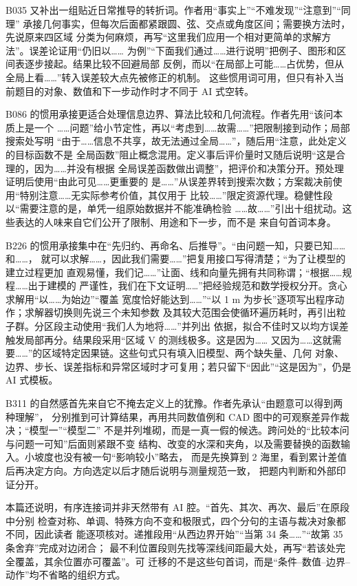 \documentclass[UTF8,a4paper,12pt]{ctexart}
\begin{document}
B035 又补出一组贴近日常推导的转折词。作者用“事实上”“不难发现”“注意到”“同理”
承接几何事实，但每次后面都紧跟圆、弦、交点或角度区间；需要换方法时，先说原来四区域
分类为何麻烦，再写“这里我们应用一个相对更简单的求解方法”。误差论证用“仍旧以……
为例”“下面我们通过……进行说明”把例子、图形和区间表逐步接起。结果比较不回避局部
反例，而以“在局部上可能……占优势，但从全局上看……”转入误差较大点先被修正的机制。
这些惯用词可用，但只有补入当前题目的对象、数值和下一步动作时才不同于 AI 式空转。

B086 的惯用承接更适合处理信息边界、算法比较和几何流程。作者先用“该问本质上是一个
……问题”给小节定性，再以“考虑到……故需……”把限制接到动作；局部搜索处写明
“由于……信息不共享，故无法通过全局……”，随后用“注意，此处定义的目标函数不是
全局函数”阻止概念混用。定义事后评价量时又随后说明“这是合理的，因为……并没有根据
全局误差函数做出调整”，把评价和决策分开。预处理证明后使用“由此可见……更重要的
是……”从误差界转到搜索次数；方案裁决前使用“特别注意……无实际参考价值，其仅用于
比较……”限定资源代理。稳健性段以“需要注意的是，单凭一组原始数据并不能准确检验
……故……”引出十组扰动。这些表达的人味来自它们公开了限制、用途和下一步，而不是
来自句首词本身。

B226 的惯用承接集中在“先归约、再命名、后推导”。“由问题一知，只要已知……和……，
就可以求解……，因此我们需要……”把复用接口写得清楚；“为了让模型的建立过程更加
直观易懂，我们记……”让面、线和向量先拥有共同称谓；“根据……规程……出于建模的
严谨性，我们在下文证明……”把经验规范和数学授权分开。贪心求解用“以……为始边”“覆盖
宽度恰好能达到……”“以 1 m 为步长”逐项写出程序动作；求解器切换则先说三个未知参数
及其较大范围会使循环遍历耗时，再引出粒子群。分区段主动使用“我们人为地将……”并列出
依据，拟合不佳时又以均方误差触发局部再分。结果段采用“区域 V 的测线极多。这是因为……
又因为……这就需要……”的区域特定因果链。这些句式只有填入旧模型、两个缺失量、几何
对象、边界、步长、误差指标和异常区域时才可复用；若只留下“因此”“这是因为”，仍是 AI
式模板。

B311 的自然感首先来自它不掩去定义上的犹豫。作者先承认“由题意可以得到两种理解”，
分别推到可计算结果，再用共同数值例和 CAD 图中的可观察差异作裁决；“模型一”“模型二”
不是并列堆砌，而是一真一假的候选。跨问处的“比较本问与问题一可知”后面则紧跟不变
结构、改变的水深和夹角，以及需要替换的函数输入。小坡度也没有被一句“影响较小”略去，
而是先换算到 2 海里，看到累计差值后再决定方向。方向选定以后才随后说明与测量规范一致，
把题内判断和外部印证分开。

本篇还说明，有序连接词并非天然带有 AI 腔。“首先、其次、再次、最后”在原段中分别
检查对称、单调、特殊方向不变和极限式，四个分句的主语与裁决对象都不同，因此读者
能逐项核对。递推段用“从西边界开始”“当第 34 条……”“故第 35 条舍弃”完成对边闭合；
最不利位置段则先找等深线间距最大处，再写“若该处完全覆盖，其余位置亦可覆盖”。可
迁移的不是这些句首词，而是“条件--数值--边界--动作”均不省略的组织方式。
\end{document}
